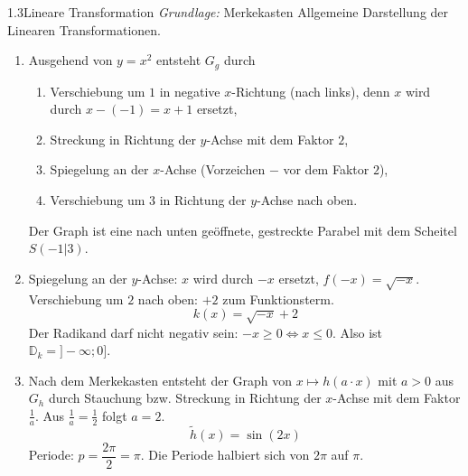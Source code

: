 \begin{loesung}{1.3}{Lineare Transformation}
\textit{Grundlage:} Merkekasten \glqq Allgemeine Darstellung der Linearen Transformationen\grqq.
\begin{enumerate}[label=\alph*)]
  \item Ausgehend von $y=x^2$ entsteht $G_g$ durch
  \begin{enumerate}[label=\arabic*.]
    \item Verschiebung um $1$ in negative $x$-Richtung (nach links), denn $x$ wird durch $x-(-1)=x+1$ ersetzt,
    \item Streckung in Richtung der $y$-Achse mit dem Faktor $2$,
    \item Spiegelung an der $x$-Achse (Vorzeichen $-$ vor dem Faktor $2$),
    \item Verschiebung um $3$ in Richtung der $y$-Achse nach oben.
  \end{enumerate}
  Der Graph ist eine nach unten geöffnete, gestreckte Parabel mit dem Scheitel $S(-1|3)$.
  \item Spiegelung an der $y$-Achse: $x$ wird durch $-x$ ersetzt, $f(-x) = \sqrt{-x}$.\\
  Verschiebung um $2$ nach oben: $+2$ zum Funktionsterm.
  \[k(x) = \sqrt{-x}+2\]
  Der Radikand darf nicht negativ sein: $-x\geq 0 \Longleftrightarrow x\leq 0$. Also ist $\mathds{D}_k = ]-\infty;0]$.
  \item Nach dem Merkekasten entsteht der Graph von $x\mapsto h(a\cdot x)$ mit $a>0$ aus $G_h$ durch Stauchung bzw. Streckung in Richtung der $x$-Achse mit dem Faktor $\frac{1}{a}$. Aus $\frac{1}{a}=\frac{1}{2}$ folgt $a=2$.
  \[\tilde{h}(x) = \sin{(2x)}\]
  Periode: $p = \dfrac{2\pi}{2} = \pi$. Die Periode halbiert sich von $2\pi$ auf $\pi$.
\end{enumerate}
\end{loesung}

